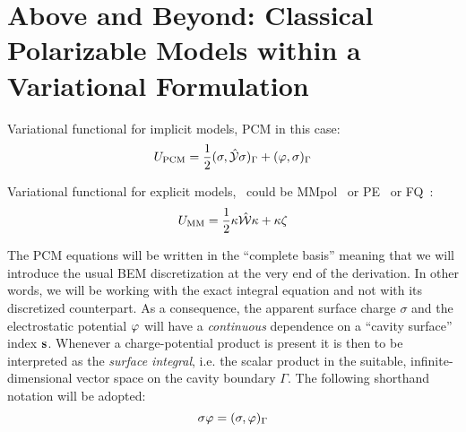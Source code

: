 \section[Variational Formulation of Classical Polarizable Models]{
Above and Beyond: Classical Polarizable Models within a Variational Formulation}
\label{sec:variational}

Variational functional for implicit models, \acs{PCM} in this
case:~\autocite{Lipparini2010-be, Lipparini2011-aj, Lipparini2016-mo}
\begin{equation}
 U_\mathrm{PCM} = \frac{1}{2}(\sigma, \hat{\mathcal{Y}}\sigma)_{\Gamma} + (\varphi, \sigma)_{\Gamma}
\end{equation}

Variational functional for explicit models,~\autocite{Lipparini} could be
MMpol~\autocite{Curutchet} or PE~\autocite{Steindal, Kongsted, Olsen} or
FQ~\autocite{Rick1994-mn, Rick1995-wu, Rick1996-om, Lipparini}:
\begin{equation}
  U_\mathrm{MM} = \frac{1}{2}\kappa\hat{\mathcal{W}}\kappa + \kappa\zeta
\end{equation}

The PCM equations will be written in the ``complete basis'' meaning that
we will introduce the usual \ac{BEM} discretization
at the very end of the derivation. In other words, we will be working
with the exact integral equation and not with its discretized
counterpart. As a consequence, the apparent surface charge $\sigma$ and
the electrostatic potential $\varphi$ will have a \emph{continuous}
dependence on a ``cavity surface'' index $\mathbf{s}$. Whenever a
charge-potential product is present it is then to be interpreted as the
\emph{surface integral}, i.e. the scalar product in the suitable,
infinite-dimensional vector space on the cavity boundary $\Gamma$. The
following shorthand notation will be adopted:
\begin{equation}
 \sigma\varphi = (\sigma, \varphi)_{\Gamma}
\end{equation}

